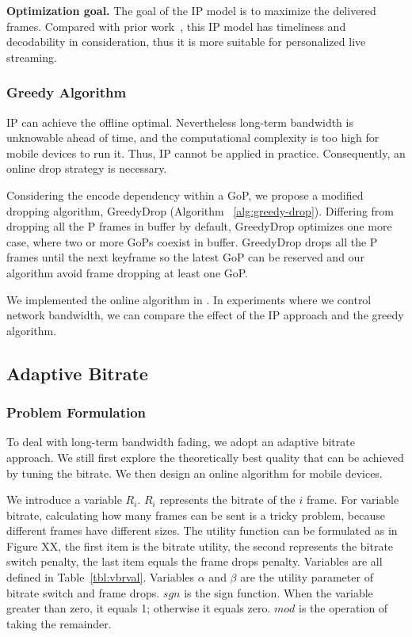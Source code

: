 \textbf{Optimization goal.} The goal of the IP model is to maximize the delivered frames.
Compared with prior work~\cite{singh2004dynamic}, this IP model has timeliness and decodability in consideration, thus it is more suitable for personalized live streaming.


\subsubsection{Greedy Algorithm}

IP can achieve the offline optimal. Nevertheless long-term bandwidth is unknowable ahead of time, and the computational complexity is too high for mobile devices to run it. Thus, IP cannot be applied in practice. Consequently, an online drop strategy is necessary.

 Considering the encode dependency within a GoP, we propose a modified dropping algorithm, GreedyDrop (Algorithm ~\ref{alg:greedy-drop}). Differing from dropping all the P frames in buffer by default, GreedyDrop optimizes one more case, where two or more GoPs coexist in buffer. GreedyDrop drops all the P frames until the next keyframe so the latest GoP can be reserved and our algorithm avoid frame dropping at least one GoP.

We implemented the online algorithm in \name. In experiments where we control network bandwidth, we can compare the effect of the IP approach and the greedy algorithm.

\subsection{Adaptive Bitrate}
\label{subsec:adaptive-bitrate}
\subsubsection{Problem Formulation}



To deal with long-term bandwidth fading, we adopt an adaptive bitrate approach. We still first explore the theoretically best quality that can be achieved by tuning the bitrate. We then design an online algorithm for mobile devices.

We introduce a variable $R_{i}$. $R_{i}$ represents the bitrate of the $i$ frame. For variable bitrate, calculating how many frames can be sent is a tricky problem, because different frames have different sizes.
The utility function can be formulated as in Figure XX,
the first item is the bitrate utility, the second represents the bitrate switch penalty, the last item equals the frame drops penalty. Variables are all defined in Table~\ref{tbl:vbrval}. Variables $\alpha$ and $\beta$ are the utility parameter of bitrate switch and frame drops. $sgn$ is the sign function. When the variable greater than zero, it equals 1; otherwise it equals zero. $mod$ is the operation of taking the remainder.

